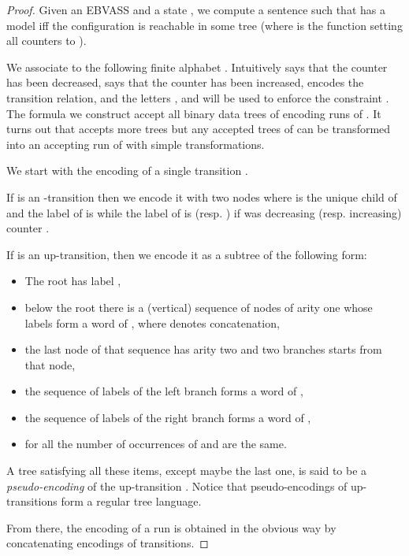 \documentclass{CSML}
\newcommand\ebvass{\textup{EBVASS}\xspace}
\begin{document}
\begin{proof}
Given an \ebvass  and a state , 
we compute a sentence  such that  has a model 
iff the configuration  is reachable in some tree
(where  is the function setting all counters to ).

\noindent
We associate to  the following finite alphabet
. 
Intuitively  says that the counter
 has been decreased,  says that the counter  has been increased,
 encodes the transition relation, and the letters ,  and  will be used to enforce 
the constraint . 
The formula  we construct accept all binary data trees 
of  encoding runs of . It turns out that 
accepts more trees but any accepted trees of  can be transformed into an accepting
run of  with simple transformations.

\noindent
We start with the encoding of a single transition .

\noindent
If  is an -transition then we encode it with two nodes
 where  is the unique child of  and the label of  is  while
the label of  is  (resp. ) 
if  was decreasing (resp. increasing) counter .

\noindent
If  is an up-transition, then we encode
it as a subtree of the following form:
\begin{itemize}
\item The root has label ,
\item below the root there is a (vertical) sequence of nodes of arity one whose 
  labels form a word of
  , 
  where  denotes concatenation,
\item the last node of that sequence has arity two and two branches starts from that node,
\item the sequence of labels of the left branch forms a word of
,
\item the sequence of labels of the right branch forms a word of
,
\item for all  the number of occurrences of  and
   are the same.
\end{itemize}
A tree satisfying all these items, except maybe the last one, is said to be a \emph{pseudo-encoding} of the up-transition . 
Notice that pseudo-encodings of up-transitions form a regular tree language.

\noindent
From there, the encoding of a run is obtained in the obvious way by concatenating
encodings of transitions.


\end{proof}
\end{document}
